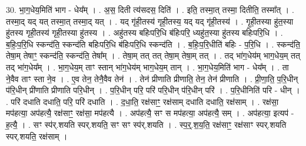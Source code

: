\documentclass[17pt]{extarticle}
\begin{document}
30. भा॒ग॒धेय॒मिति॑ भाग - धेय᳚म् । . अ॒स॒ दिती त्य॑सदस॒ दिति॑ । . इति॒ तस्मा॒त् तस्मा॒ दितीति॒ तस्मा᳚त् । . तस्मा॒द् यद् यत् तस्मा॒त् तस्मा॒द् यत् । . यद् गृ॑ही॒तस्य॑ गृही॒तस्य॒ यद् यद् गृ॑ही॒तस्य॑ । . गृ॒ही॒तस्या हु॑त॒स्या हु॑तस्य गृही॒तस्य॑ गृही॒तस्या हु॑तस्य । . अहु॑तस्य बहिःपरि॒धि ब॑हिःपरि॒ ध्यहु॑त॒स्या हु॑तस्य बहिःपरि॒धि । . ब॒हिः॒प॒रि॒धि स्कन्द॑ति॒ स्कन्द॑ति बहिःपरि॒धि ब॑हिःपरि॒धि स्कन्द॑ति । . ब॒हिः॒प॒रि॒धीति॑ बहिः - प॒रि॒धि । . स्कन्द॑ति॒ तेषा॒म् तेषाꣳ॒॒ स्कन्द॑ति॒ स्कन्द॑ति॒ तेषा᳚म् । . तेषा॒म् तत् तत् तेषा॒म् तेषा॒म् तत् । . तद् भा॑ग॒धेय॑म् भाग॒धेय॒म् तत् तद् भा॑ग॒धेय᳚म् । . भा॒ग॒धेय॒म् ताꣳ स्तान् भा॑ग॒धेय॑म् भाग॒धेय॒म् तान् । . भा॒ग॒धेय॒मिति॑ भाग - धेय᳚म् । . ता ने॒वैव ताꣳ स्ता ने॒व । . ए॒व तेन॒ तेनै॒वैव तेन॑ । . तेन॑ प्रीणाति प्रीणाति॒ तेन॒ तेन॑ प्रीणाति । . प्री॒णा॒ति॒ प॒रि॒धीन् प॑रि॒धीन् प्री॑णाति प्रीणाति परि॒धीन् । . प॒रि॒धीन् परि॒ परि॑ परि॒धीन् प॑रि॒धीन् परि॑ । . प॒रि॒धीनिति॑ परि - धीन् । . परि॑ दधाति दधाति॒ परि॒ परि॑ दधाति । . द॒धा॒ति॒ रक्ष॑साꣳ॒॒ रक्ष॑साम् दधाति दधाति॒ रक्ष॑साम् । . रक्ष॑सा॒ मप॑हत्या॒ अप॑हत्यै॒ रक्ष॑साꣳ॒॒ रक्ष॑सा॒ मप॑हत्यै । . अप॑हत्यै॒ सꣳ स मप॑हत्या॒ अप॑हत्यै॒ सम् । . अप॑हत्या॒ इत्यप॑ - ह॒त्यै॒ । . सꣳ स्प॑र्.शयति स्पर्.शयति॒ सꣳ सꣳ स्प॑र्.शयति । . स्प॒र्॒.श॒य॒ति॒ रक्ष॑साꣳ॒॒ रक्ष॑साꣳ स्पर्.शयति स्पर्.शयति॒ रक्ष॑साम् । \newline
\end{document}
